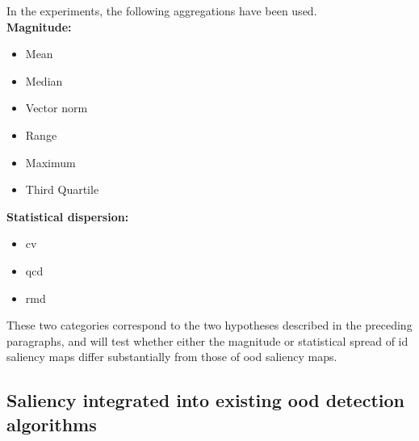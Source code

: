 \documentclass[UKenglish]{uiomasterthesis} %
\theoremstyle{definition}
\begin{document}

In the experiments, the following aggregations have been used. \\

\textbf{Magnitude:}
\begin{itemize}
    \itemsep0em
    \item Mean
    \item Median
    \item Vector norm
    \item Range
    \item Maximum
    \item Third Quartile
\end{itemize}

\textbf{Statistical dispersion:}
\begin{itemize}
    \itemsep0em
    \item \acf{cv}
    \item \acf{qcd}
    \item \acf{rmd}
\end{itemize}

These two categories correspond to the two hypotheses described in the preceding paragraphs, and will test whether either the magnitude or statistical spread of \ac{id} saliency maps differ substantially from those of \ac{ood} saliency maps.


\subsection{Saliency integrated into existing \ac{ood} detection algorithms}
\end{document}
